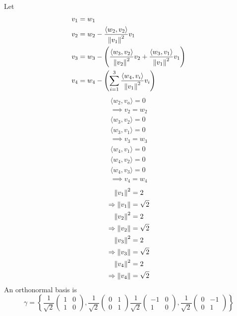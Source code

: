\begin{enumerate}
\begin{align}
\end{align}
Let
\begin{align}
v_1 &= w_1\\
v_2 &= w_2 - \frac{\langle w_2,v_2\rangle}{\left\lVert v_1\right\rVert^2}v_1\\
v_3 &= w_3 - \left(\frac{\langle w_3,v_2\rangle}{\left\lVert v_2\right\rVert^2}v_2 +
  \frac{\langle w_3,v_1\rangle}{\left\lVert v_1\right\rVert^2}v_1\right)\\
v_4 &=  w_4 -\left(\sum\limits_{i=1}^3\frac{\langle w_4,v_i\rangle}{\left\lVert v_1\right\rVert^2}v_i\right)
\end{align}
\begin{gather}
\langle w_2,v_a \rangle = 0\\
\implies v_2 = w_2\\
\langle w_3,v_2\rangle = 0\\
\langle w_3,v_1\rangle = 0\\
\implies v_3 = w_3\\
\langle w_4,v_1 \rangle = 0\\
\langle w_4,v_2\rangle = 0\\
\langle w_4,v_3\rangle = 0\\
\implies v_4 = w_4
\end{gather}
\begin{gather}
\left\lVert v_1\right\rVert^2 = 2\\
\Rightarrow \left\lVert v_1\right\rVert = \sqrt{2}\\
\left\lVert v_2\right\rVert^2 = 2\\
\Rightarrow \left\lVert v_2\right\rVert = \sqrt{2}\\
\left\lVert v_3\right\rVert^2 = 2\\
\Rightarrow \left\lVert v_3\right\rVert = \sqrt{2}\\
\left\lVert v_4\right\rVert^2 = 2 \\
\Rightarrow \left\lVert v_4\right\rVert = \sqrt{2}
\end{gather}
An orthonormal basis is
\begin{equation}
\gamma =\left\{
\frac{1}{\sqrt{2}}
\begin{pmatrix}1&0\\1&0\end{pmatrix},
\frac{1}{\sqrt{2}}
\begin{pmatrix} 0 & 1\\ 0 & 1\end{pmatrix}
\frac{1}{\sqrt{2}}
\begin{pmatrix}-1&0\\1&0\end{pmatrix},
\frac{1}{\sqrt{2}}
\begin{pmatrix}0&-1\\0&1\end{pmatrix}
\right\}
\end{equation}
\end{enumerate}
